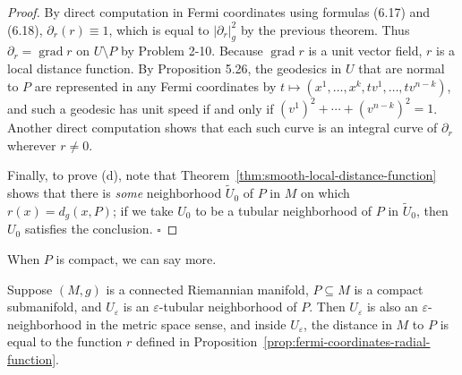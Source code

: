 \begin{proof}
By direct computation in Fermi coordinates using formulas (6.17) and (6.18), $\partial_r(r) \equiv 1$, which is equal to $|\partial_r|_g^2$ by the previous theorem. Thus $\partial_r = \operatorname{grad} r$ on $U \setminus P$ by Problem 2-10. Because $\operatorname{grad} r$ is a unit vector field, $r$ is a local distance function. By Proposition 5.26, the geodesics in $U$ that are normal to $P$ are represented in any Fermi coordinates by $t \mapsto (x^1, \ldots, x^k, tv^1, \ldots, tv^{n-k})$, and such a geodesic has unit speed if and only if $(v^1)^2 + \cdots + (v^{n-k})^2 = 1$. Another direct computation shows that each such curve is an integral curve of $\partial_r$ wherever $r \neq 0$.

Finally, to prove (d), note that Theorem~\ref{thm:smooth-local-distance-function} shows that there is \emph{some} neighborhood $\widetilde{U}_0$ of $P$ in $M$ on which $r(x) = d_g(x, P)$; if we take $U_0$ to be a tubular neighborhood of $P$ in $\widetilde{U}_0$, then $U_0$ satisfies the conclusion. $\square$
\end{proof}

When $P$ is compact, we can say more.

\begin{theorem}
\label{thm:tubular-neighborhood-metric-distance}

Suppose $(M, g)$ is a connected Riemannian manifold, $P \subseteq M$ is a compact submanifold, and $U_\varepsilon$ is an $\varepsilon$-tubular neighborhood of $P$. Then $U_\varepsilon$ is also an $\varepsilon$-neighborhood in the metric space sense, and inside $U_\varepsilon$, the distance in $M$ to $P$ is equal to the function $r$ defined in Proposition~\ref{prop:fermi-coordinates-radial-function}.
\end{theorem}

